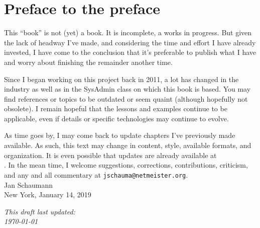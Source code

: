 \chapter{Preface to the preface}

This ``book'' is not (yet) a book.  It is incomplete,
a works in progress.  But given the lack of headway
I've made, and considering the time and effort I have
already invested, I have come to the conclusion that
it's preferable to publish what I have and worry about
finishing the remainder another time.

Since I began working on this project back in 2011, a
lot has changed in the industry as well as in the
SysAdmin class on which this book is based.  You may
find references or topics to be outdated or seem
quaint (although hopefully not obsolete).  I remain
hopeful that the lessons and examples continue to be
applicable, even if details or specific technologies
may continue to evolve.

As time goes by, I may come back to update chapters
I've previously made available.  As such, this text
may change in content, style, available formats, and
organization.  It is even possible that updates are
already available at \\
.
In the mean time, I welcome suggestions, corrections,
contributions, criticism, and any and all commentary at
{\tt jschauma@netmeister.org}.  \\

\noindent
Jan Schaumann \\
New York, January 14, 2019

\addvspace{.5in}
\noindent
{\em This draft last updated: \\
\today}
